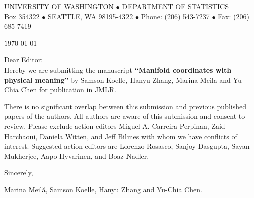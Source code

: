 \documentclass[11pt]{article}
\begin{document}
\pagestyle{empty}

\begin{center}
{\large UNIVERSITY OF WASHINGTON $\bullet$ DEPARTMENT OF STATISTICS}\\
{\small Box 354322 $\bullet$ SEATTLE, WA 98195-4322 $\bullet$ Phone:
(206) 543-7237 $\bullet$ Fax: (206) 685-7419} \\
\end{center}

\vspace{-0.5cm}
\begin{tabbing}
{}\` \today  \\
\end{tabbing}

\vspace{-0.5cm}
Dear Editor:\\

\vspace{0.5in}
Hereby we are submitting the manuscript {\bf ``Manifold coordinates with physical meaning''} by Samson Koelle, Hanyu Zhang, Marina Meila and Yu-Chia Chen for publication in JMLR.

There is no significant overlap between this submission and previous published papers of the authors. All authors  are aware of this submission and consent to review. Please exclude action editors Miguel A. Carreira-Perpinan, Zaid Harchaoui, Daniela Witten, and Jeff Bilmes with whom we have conflicts of interest. Suggested action editors are Lorenzo Rosasco, Sanjoy Dasgupta, Sayan Mukherjee, Aapo Hyvarinen, and Boaz Nadler. 


Sincerely,

\vspace{0.2in}
Marina Meil\u{a}, Samson Koelle, Hanyu Zhang and Yu-Chia Chen.
\end{document}
